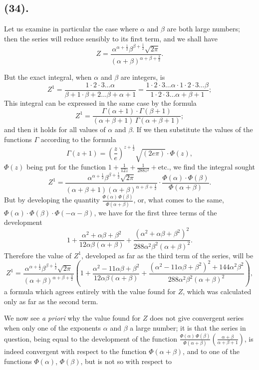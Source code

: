 \documentclass{article}
\begin{document}
\subsection*{(34).}

Let us examine in particular the case where $\alpha$ and $\beta$ are both large numbers; then the series will reduce sensibly to its first term, and we shall have
\[ Z=\frac{\alpha^{\alpha+\frac{1}{2}}\beta^{\beta+\frac{1}{2}}\sqrt{2\pi}}{(\alpha+\beta)^{\alpha+\beta+\frac{3}{2}}}. \]

But the exact integral, when $\alpha$ and $\beta$ are integers, is
\[ Z^{1}=\frac{1\cdot2\cdot3\ldots\alpha}{\beta+1\cdot\beta+2\ldots\beta+\alpha+1}=\frac{1\cdot2\cdot3\ldots\alpha\cdot1\cdot2\cdot3\ldots\beta}{1\cdot2\cdot3\ldots\alpha+\beta+1}; \]
This integral can be expressed in the same case by the formula
\[ Z^{1}=\frac{\Gamma(\alpha+1)\cdot\Gamma(\beta+1)}{(\alpha+\beta+1)\,\Gamma(\alpha+\beta+1)}; \]
and then it holds for all values of $\alpha$ and $\beta$. If we then substitute the values of the functions $\Gamma$ according to the formula
\[ \Gamma(z+1)=\left(\frac{z}{e}\right)^{z+\frac{1}{2}}\sqrt{(2e\pi)}\cdot\Phi(z), \]
$\Phi(z)$ being put for the function $1+\frac{1}{12z}+\frac{1}{288z^{2}}+\text{etc.}$, we find the integral sought
\[ Z^{1}=\frac{\alpha^{\alpha+\frac{1}{2}}\beta^{\beta+\frac{1}{2}}\sqrt{2\pi}}{(\alpha+\beta+1)(\alpha+\beta)^{\alpha+\beta+\frac{1}{2}}}\cdot\frac{\Phi(\alpha)\cdot\Phi(\beta)}{\Phi(\alpha+\beta)}. \]
But by developing the quantity $\frac{\Phi(\alpha)\,\Phi(\beta)}{\Phi(\alpha+\beta)}$, or, what comes to the same, $\Phi(\alpha)\cdot\Phi(\beta)\cdot\Phi(-\alpha-\beta)$, we have for the first three terms of the development
\[ 1+\frac{\alpha^{2}+\alpha\beta+\beta^{2}}{12\alpha\beta(\alpha+\beta)}+\frac{(\alpha^{2}+\alpha\beta+\beta^{2})^{2}}{288\alpha^{2}\beta^{2}(\alpha+\beta)^{2}}. \]
Therefore the value of $Z^{1}$, developed as far as the third term of the series, will be
\[ Z^{1}=\frac{\alpha^{\alpha+\frac{1}{2}}\beta^{\beta+\frac{1}{2}}\sqrt{2\pi}}{(\alpha+\beta)^{\alpha+\beta+\frac{3}{2}}}\left(1+\frac{\alpha^{2}-11\alpha\beta+\beta^{2}}{12\alpha\beta(\alpha+\beta)}+\frac{(\alpha^{2}-11\alpha\beta+\beta^{2})^{2}+144\alpha^{2}\beta^{2}}{288\alpha^{2}\beta^{2}(\alpha+\beta)^{2}}\right), \]
a formula which agrees entirely with the value found for $Z$, which was calculated only as far as the second term.

We now see \emph{a priori} why the value found for $Z$ does not give  convergent series when only one of the exponents $\alpha$ and $\beta$  a large number; it is that the series in question, being equal to the development of the function $\frac{\Phi(\alpha)\,\Phi(\beta)}{\Phi(\alpha+\beta)}\left(\frac{\alpha+\beta}{\alpha+\beta+1}\right)$, is indeed convergent with respect to the function $\Phi(\alpha+\beta)$, and to one of the functions $\Phi(\alpha)$, $\Phi(\beta)$, but is not so with respect to
\end{document}
